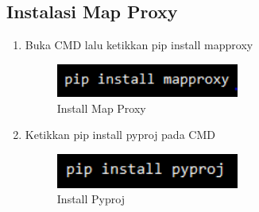 \subsection{Instalasi Map Proxy}
\begin{enumerate}
	\item Buka CMD lalu ketikkan pip install mapproxy 
		\begin{figure}[H]
			\includegraphics[width=6cm]{figures/Tugas4/1174076/8.png}
			\centering
			\caption{Install Map Proxy}
		\end{figure}
	\item Ketikkan pip install pyproj pada CMD
		\begin{figure}[H]
			\includegraphics[width=6cm]{figures/Tugas4/1174076/9.png}
			\centering
			\caption{Install Pyproj}
		\end{figure}
\end{enumerate}

